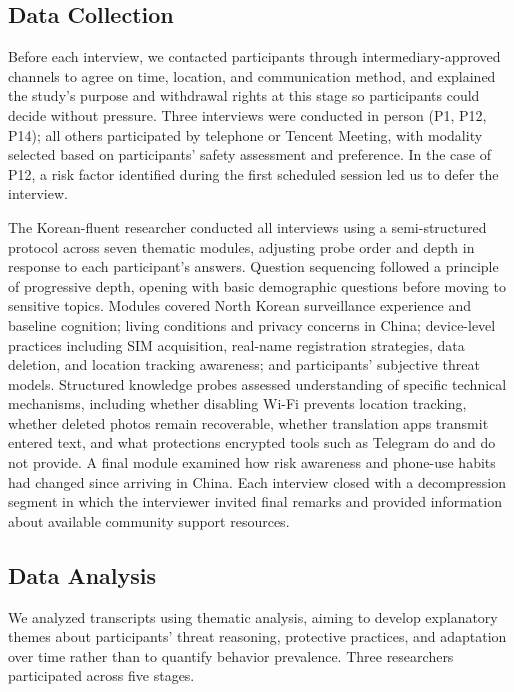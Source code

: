 \documentclass[conference,compsoc]{IEEEtran}
\begin{document}
\subsection{Data Collection}

Before each interview, we contacted participants through intermediary-approved channels to agree on time, location, and communication method, and explained the study's purpose and withdrawal rights at this stage so participants could decide without pressure. Three interviews were conducted in person (P1, P12, P14); all others participated by telephone or Tencent Meeting, with modality selected based on participants' safety assessment and preference. In the case of P12, a risk factor identified during the first scheduled session led us to defer the interview.

The Korean-fluent researcher conducted all interviews using a semi-structured protocol across seven thematic modules, adjusting probe order and depth in response to each participant's answers. Question sequencing followed a principle of progressive depth, opening with basic demographic questions before moving to sensitive topics. Modules covered North Korean surveillance experience and baseline cognition; living conditions and privacy concerns in China; device-level practices including SIM acquisition, real-name registration strategies, data deletion, and location tracking awareness; and participants' subjective threat models. Structured knowledge probes assessed understanding of specific technical mechanisms, including whether disabling Wi-Fi prevents location tracking, whether deleted photos remain recoverable, whether translation apps transmit entered text, and what protections encrypted tools such as Telegram do and do not provide. A final module examined how risk awareness and phone-use habits had changed since arriving in China. Each interview closed with a decompression segment in which the interviewer invited final remarks and provided information about available community support resources.

\subsection{Data Analysis}

We analyzed transcripts using thematic analysis, aiming to develop explanatory themes about participants' threat reasoning, protective practices, and adaptation over time rather than to quantify behavior prevalence. Three researchers participated across five stages.
\end{document}
